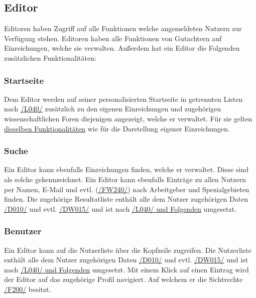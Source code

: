 \subsection{Editor}\label{funkt:editor}
Editoren haben Zugriff auf alle Funktionen welche angemeldeten Nutzern zur Verfügung stehen.
Editoren haben alle Funktionen von Gutachtern auf Einreichungen, welche sie verwalten.
Außerdem hat ein Editor die Folgenden zusätzlichen Funktionalitäten:

\subsubsection{Startseite}
\begin{description}
     Dem Editor werden auf seiner personalisierten Startseite in getrennten Listen nach \hyperref[leist:040]{/L040/}
    zusätzlich zu den eigenen
    Einreichungen und zugehörigen wissenschaftlichen Foren diejenigen angezeigt, welche er verwaltet.
    Für sie gelten \hyperref[nut:start]{dieselben Funktionalitäten} wie für die Darstellung eigener Einreichungen.
\end{description}

\subsubsection{Suche} \label{ed:suche}
\begin{description}
     Ein Editor kann ebenfalls Einreichungen finden, welche er verwaltet.
    Diese sind als solche gekennzeichnet.
     Ein Editor kann ebenfalls Einträge zu allen Nutzern per Namen, E-Mail und
    evtl. (\hyperref[funkt:240]{/FW240/}) nach Arbeitgeber und Spezialgebieten finden.
    Die zugehörige Resultatliste enthält alle dem Nutzer zugehörigen Daten \hyperref[d010]{/D010/} und evtl. \hyperref[d015]{/DW015/}
    und ist nach \hyperref[leist:40]{/L040/ und Folgenden} umgesetzt.
\end{description}

\subsubsection{Benutzer} \label{ed:benutzer}
\begin{description}
     Ein Editor kann auf die Nutzerliste über die Kopfzeile zugreifen.
     Die Nutzerliste enthält alle dem Nutzer zugehörigen Daten \hyperref[d010]{/D010/} und evtl. \hyperref[d015]{/DW015/}
    und ist nach \hyperref[leist:040]{/L040/ und Folgenden} umgesetzt.
     Mit einem Klick auf einen Eintrag wird der Editor auf das zugehörige Profil navigiert.
    Auf welchem er die Sichtrechte \hyperref[funkt:200]{/F200/} besitzt.
\end{description}


